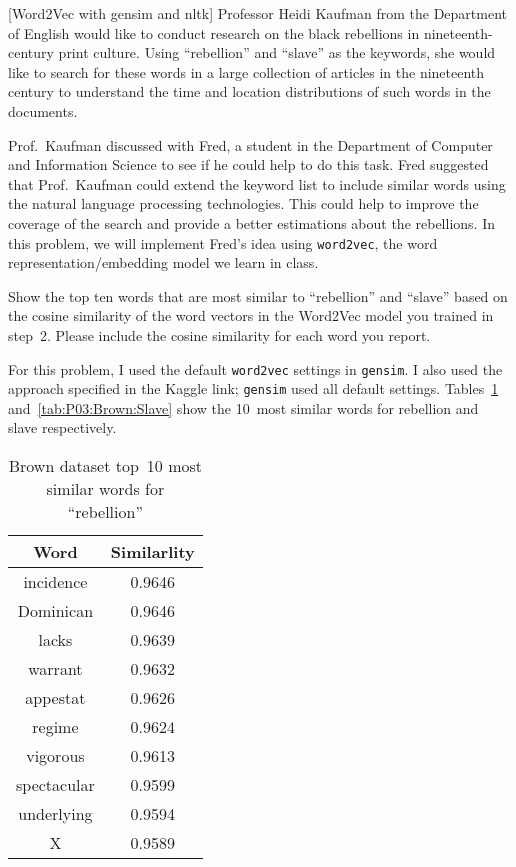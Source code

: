 \begin{problem}
  \textnormal{[Word2Vec with gensim and nltk]} Professor Heidi Kaufman from the Department of English would like to conduct research on the black rebellions in nineteenth-century print culture. Using ``rebellion'' and ``slave'' as the keywords, she would like to search for these words in a large collection of articles in the nineteenth century to understand the time and location distributions of such words in the documents.

  Prof.\ Kaufman discussed with Fred, a student in the Department of Computer and Information Science to see if he could help to do this task. Fred suggested that Prof.\ Kaufman could extend the keyword list to include similar words using the natural language processing technologies. This could help to improve the coverage of the search and provide a better estimations about the rebellions. In this problem, we will implement Fred’s idea using \texttt{word2vec}, the word representation/embedding model we learn in class.
\end{problem}

\begin{subproblem}
  Show the top ten words that are most similar to ``rebellion'' and ``slave'' based on the cosine similarity of the word vectors in the Word2Vec model you trained in step~2. Please include the cosine similarity for each word you report.
\end{subproblem}

For this problem, I used the default \texttt{word2vec} settings in \texttt{gensim}.  I also used the approach specified in the Kaggle link; \texttt{gensim} used all default settings.  Tables~\ref{tab:P03:Brown:Rebellion} and~\ref{tab:P03:Brown:Slave} show the 10~most similar words for rebellion and slave respectively.

\begin{table}[h]
  \centering
  \caption{Brown dataset top~10 most similar words for ``rebellion''}\label{tab:P03:Brown:Rebellion}
  \begin{tabular}{|c|c|}
    \hline
    \textbf{Word} & \textbf{Similarlity} \\\hline\hline
    incidence     & 0.9646 \\\hline
    Dominican     & 0.9646 \\\hline
    lacks         & 0.9639 \\\hline
    warrant       & 0.9632 \\\hline
    appestat      & 0.9626 \\\hline
    regime        & 0.9624 \\\hline
    vigorous      & 0.9613 \\\hline
    spectacular   & 0.9599 \\\hline
    underlying    & 0.9594 \\\hline
    X             & 0.9589 \\\hline
  \end{tabular}
\end{table}

